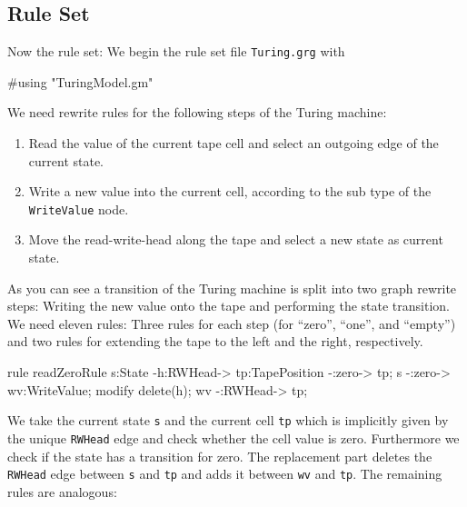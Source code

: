 \subsection{Rule Set}
Now the rule set: We begin the rule set file \texttt{Turing.grg} with
\begin{grgen}[firstnumber=1]
#using "TuringModel.gm"

\end{grgen}
We need rewrite rules for the following steps of the Turing machine:
\begin{enumerate}
  \item Read the value of the current tape cell and select an outgoing edge of the current state.
  \item Write a new value into the current cell, according to the sub type of the \texttt{WriteValue} node.
  \item Move the read-write-head along the tape and select a new state as current state.
\end{enumerate}
As you can see a transition of the Turing machine is split into two graph rewrite steps: Writing the new value onto the tape and performing the state transition. We need eleven rules: Three rules for each step (for ``zero'', ``one'', and ``empty'') and two rules for extending the tape to the left and the right, respectively.
\begin{grgen}[firstnumber=last]
rule readZeroRule {
	s:State -h:RWHead-> tp:TapePosition -:zero-> tp;
	s -:zero-> wv:WriteValue;
	modify {
		delete(h);
		wv -:RWHead-> tp;
	}
}

\end{grgen}
We take the current state \texttt{s} and the current cell \texttt{tp} which is implicitly given by the unique \texttt{RWHead} edge and check whether the cell value is zero. Furthermore we check if the state has a transition for zero. The replacement part deletes the \texttt{RWHead} edge between \texttt{s} and \texttt{tp} and adds it between \texttt{wv} and \texttt{tp}. The remaining rules are analogous:
